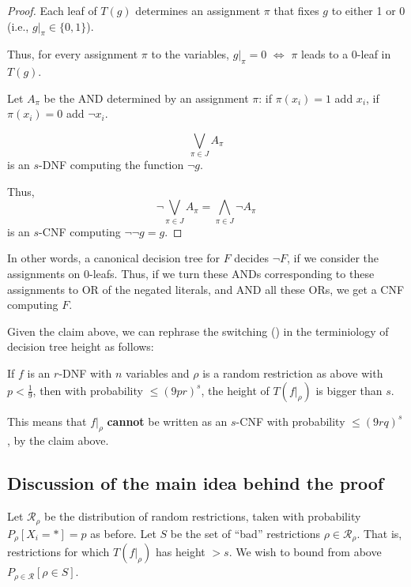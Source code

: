 \begin{proof}
Each leaf of \( T(g) \) determines an assignment \( \pi \) that fixes \( g \) to either 1 or 0 
(i.e., \( g|_{\pi} \in \{0,1\} \)).

Thus, for every assignment \( \pi \) to the variables, \( g|_{\pi} = 0 \) \( \Leftrightarrow \) 
\( \pi \) leads to a 0-leaf in \( T(g) \).

Let \( A_{\pi} \) be the AND determined by an assignment \( \pi \):
if \( \pi(x_i) = 1 \) add \( x_i \), if \( \pi(x_i) = 0 \) add \( \neg x_i \).

\[
\bigvee_{ \pi \in J } A_{\pi}
\]
is an \( s \)-DNF computing the function \( \neg g \).

Thus, 
\[
\neg \bigvee_{\pi \in J} A_{\pi} = \bigwedge_{\pi \in J} \neg A_{\pi}
\]
is an \( s \)-CNF computing \( \neg \neg g = g \).


\end{proof}

In other words, a canonical decision tree for \( F \) decides \( \neg F \),
if we consider the assignments on 0-leafs.
Thus, if we turn these ANDs corresponding to these assignments to OR of the negated literals, and AND all these ORs, 
we get a CNF computing \( F \).

Given the  claim above, we can rephrase the switching () in the terminiology of decision tree height as follows: 

\begin{theorem}\label{thm:SL-DT-version}
If \( f \) is an \( r \)-DNF with \( n \) variables 
and \( \rho \) is a random restriction as above with 
\( p < \frac{1}{9} \),
then with probability \( \leq (9pr)^s \), the height of \( T(f|_{\rho}) \) 
is bigger than \( s \).
\end{theorem}

This means that \( f|_{\rho} \) \textbf{cannot} be written as an \( s \)-CNF 
with probability \( \leq (9rq)^s \), by the claim above.

\subsection*{Discussion of the main idea behind the proof}

Let \( \mathcal{R}_{\rho} \) be the distribution of random restrictions, 
taken with probability \( P_{\rho}[X_i = *] = p \) as before.
Let \( S \) be the set of ``bad'' restrictions \( \rho \in \mathcal{R}_{\rho} \).
That is, restrictions for which \( T(f|_{\rho}) \) has height \( > s \).
We wish to bound from above \( P_{\rho\in \mathcal R}[\rho \in S] \).

